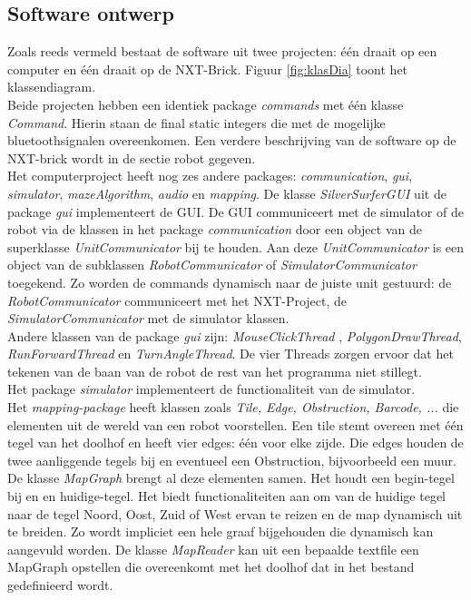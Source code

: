 \documentclass[tt3]{penoverslag}
\begin{document}
\subsection{Software ontwerp} %
\label{ssec:Sdesign}
Zoals reeds vermeld bestaat de software uit twee projecten: \'e\'en draait op een computer en \'e\'en draait op de NXT-Brick. Figuur \ref{fig:klasDia} toont het klassendiagram.\\
Beide projecten hebben een identiek package \textit{commands} met \'e\'en klasse \textit{Command}. Hierin staan de final static integers die met de mogelijke bluetoothsignalen overeenkomen. Een verdere beschrijving van de software op de NXT-brick wordt in de sectie robot gegeven.\\


Het computerproject heeft nog zes andere packages: \textit{communication}, \textit{gui}, \textit{simulator}, \textit{mazeAlgorithm}, \textit{audio} en \textit{mapping}. 
De klasse \textit{SilverSurferGUI} uit de package \textit{gui} implementeert de GUI. De GUI communiceert met de simulator of de robot via de klassen in het package \textit{communication} door een object van de superklasse \textit{UnitCommunicator} bij te houden. Aan deze \textit{UnitCommunicator} is een object van de subklassen \textit{RobotCommunicator} of \textit{SimulatorCommunicator}  toegekend. Zo worden de commands dynamisch naar de juiste unit gestuurd: de \textit{RobotCommunicator} communiceert met het NXT-Project, de \textit{SimulatorCommunicator} met de simulator klassen.\\
Andere klassen van de package \textit{gui} zijn: \textit{MouseClickThread} , \textit{PolygonDrawThread}, \textit{RunForwardThread} en \textit{TurnAngleThread}. De vier Threads zorgen ervoor dat het tekenen van de baan van de robot de rest van het programma niet stillegt. \\

Het package \textit{simulator} implementeert de functionaliteit van de simulator. \\
Het \textit{mapping-package} heeft klassen zoals \textit{Tile, Edge, Obstruction, Barcode, ...} die elementen uit de wereld van een robot voorstellen. Een tile stemt overeen met \'e\'en tegel van het doolhof en heeft vier edges: \'e\'en voor elke zijde. Die edges houden de twee aanliggende tegels bij en eventueel een Obstruction, bijvoorbeeld een muur. De klasse \textit{MapGraph} brengt al deze elementen samen. Het houdt een begin-tegel bij en en huidige-tegel. Het biedt functionaliteiten aan om van de huidige tegel naar de tegel Noord, Oost, Zuid of West ervan te reizen en de map dynamisch uit te breiden. Zo wordt impliciet een hele graaf bijgehouden die dynamisch kan aangevuld worden. De klasse \textit{MapReader} kan uit een bepaalde textfile een MapGraph opstellen die overeenkomt met het doolhof dat in het bestand gedefinieerd wordt.
\end{document}
